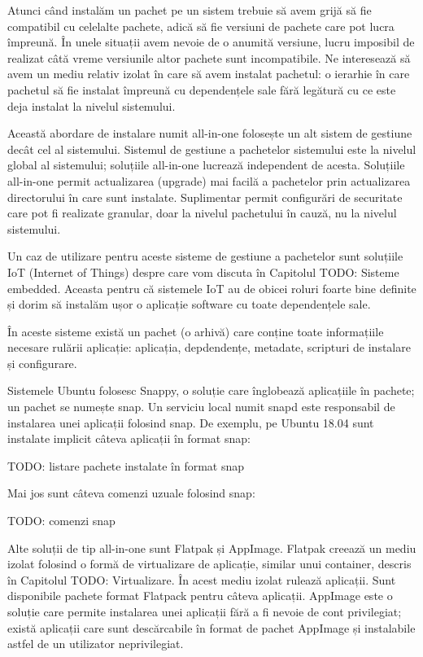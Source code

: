 Atunci când instalăm un pachet pe un sistem trebuie să avem grijă să fie compatibil cu celelalte pachete, adică să fie versiuni de pachete care pot lucra împreună. În unele situații avem nevoie de o anumită versiune, lucru imposibil de realizat câtă vreme versiunile altor pachete sunt incompatibile. Ne interesează să avem un mediu relativ izolat în care să avem instalat pachetul: o ierarhie în care pachetul să fie instalat împreună cu dependențele sale fără legătură cu ce este deja instalat la nivelul sistemului.

Această abordare de instalare numit all-in-one folosește un alt sistem de gestiune decât cel al sistemului. Sistemul de gestiune a pachetelor sistemului este la nivelul global al sistemului; soluțiile all-in-one lucrează independent de acesta. Soluțiile all-in-one permit actualizarea (upgrade) mai facilă a pachetelor prin actualizarea directorului în care sunt instalate. Suplimentar permit configurări de securitate care pot fi realizate granular, doar la nivelul pachetului în cauză, nu la nivelul sistemului.

Un caz de utilizare pentru aceste sisteme de gestiune a pachetelor sunt soluțiile IoT (Internet of Things) despre care vom discuta în Capitolul TODO: Sisteme embedded. Aceasta pentru că sistemele IoT au de obicei roluri foarte bine definite și dorim să instalăm ușor o aplicație software cu toate dependențele sale.

În aceste sisteme există un pachet (o arhivă) care conține toate informațiile necesare rulării aplicație: aplicația, depdendențe, metadate, scripturi de instalare și configurare.

Sistemele Ubuntu folosesc Snappy, o soluție care înglobează aplicațiile în pachete; un pachet se numește snap. Un serviciu local numit snapd este responsabil de instalarea unei aplicații folosind snap. De exemplu, pe Ubuntu 18.04 sunt instalate implicit câteva aplicații în format snap:

TODO: listare pachete instalate în format snap

Mai jos sunt câteva comenzi uzuale folosind snap:

TODO: comenzi snap

Alte soluții de tip all-in-one sunt Flatpak și AppImage. Flatpak creează un mediu izolat folosind o formă de virtualizare de aplicație, similar unui container, descris în Capitolul TODO: Virtualizare. În acest mediu izolat rulează aplicații. Sunt disponibile pachete format Flatpack pentru câteva aplicații. AppImage este o soluție care permite instalarea unei aplicații fără a fi nevoie de cont privilegiat; există aplicații care sunt descărcabile în format de pachet AppImage și instalabile astfel de un utilizator neprivilegiat.

